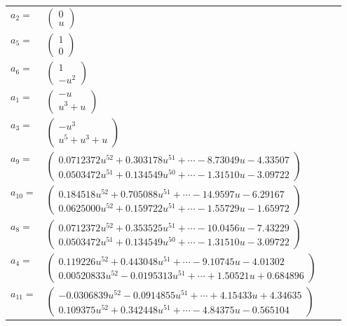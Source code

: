 \documentclass[1p]{elsarticle_modified}
\theoremstyle{definition}
\begin{document}
\begin{tabular}{m{7pt} m{180pt} m{7pt} m{180pt} }
\flushright $a_{2}=$&$\begin{pmatrix}0\\u\end{pmatrix}$ \\
\flushright $a_{5}=$&$\begin{pmatrix}1\\0\end{pmatrix}$ \\
\flushright $a_{6}=$&$\begin{pmatrix}1\\- u^2\end{pmatrix}$ \\
\flushright $a_{1}=$&$\begin{pmatrix}- u\\u^3+u\end{pmatrix}$ \\
\flushright $a_{3}=$&$\begin{pmatrix}- u^3\\u^5+u^3+u\end{pmatrix}$ \\
\flushright $a_{9}=$&$\begin{pmatrix}0.0712372 u^{52}+0.303178 u^{51}+\cdots-8.73049 u-4.33507\\0.0503472 u^{51}+0.134549 u^{50}+\cdots-1.31510 u-3.09722\end{pmatrix}$ \\
\flushright $a_{10}=$&$\begin{pmatrix}0.184518 u^{52}+0.705088 u^{51}+\cdots-14.9597 u-6.29167\\0.0625000 u^{52}+0.159722 u^{51}+\cdots-1.55729 u-1.65972\end{pmatrix}$ \\
\flushright $a_{8}=$&$\begin{pmatrix}0.0712372 u^{52}+0.353525 u^{51}+\cdots-10.0456 u-7.43229\\0.0503472 u^{51}+0.134549 u^{50}+\cdots-1.31510 u-3.09722\end{pmatrix}$ \\
\flushright $a_{4}=$&$\begin{pmatrix}0.119226 u^{52}+0.443048 u^{51}+\cdots-9.10745 u-4.01302\\0.00520833 u^{52}-0.0195313 u^{51}+\cdots+1.50521 u+0.684896\end{pmatrix}$ \\
\flushright $a_{11}=$&$\begin{pmatrix}-0.0306839 u^{52}-0.0914855 u^{51}+\cdots+4.15433 u+4.34635\\0.109375 u^{52}+0.342448 u^{51}+\cdots-4.84375 u-0.565104\end{pmatrix}$ \\

\end{tabular}
\end{document}
